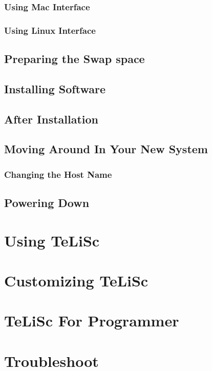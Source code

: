\documentclass[a4paper,12pt]{book}
\begin{document}
\subsection{Using Mac Interface}
\subsection{Using Linux Interface}

\section{Preparing the Swap space}
\section{Installing Software}
\section{After Installation}

\section{Moving Around In Your New System}
\subsection{Changing the Host Name}

\section{Powering Down}


\chapter{Using TeLiSc}


\chapter{Customizing TeLiSc}


\chapter{TeLiSc For Programmer} 


\chapter{Troubleshoot} 
\end{document}
